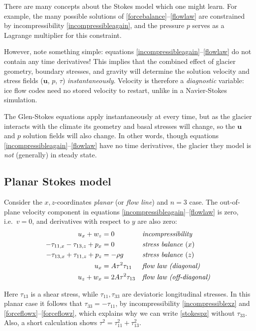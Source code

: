 \documentclass[letterpaper,final,12pt,reqno]{amsart}
\newcommand{\bu}{\mathbf{u}}
\begin{document}
There are many concepts about the Stokes model which one might learn.  For example, the many possible solutions of \eqref{forcebalance}--\eqref{flowlaw} are constrained by incompressibility \eqref{incompressibleagain}, and the pressure $p$ serves as a Lagrange multiplier for this constraint.

However, note something simple: equations \eqref{incompressibleagain}--\eqref{flowlaw} do not contain any time derivatives!  This implies that the combined effect of glacier geometry, boundary stresses, and gravity will determine \cite{JouvetRappaz2011} the solution velocity and stress fields ($\bu$, $p$, $\tau$) \emph{instantaneously}.  Velocity is therefore a \emph{diagnostic} variable: ice flow codes need no stored velocity to restart, unlike in a Navier-Stokes simulation.

The Glen-Stokes equations apply instantaneously at every time, but as the glacier interacts with the climate its geometry and basal stresses will change, so the $\bu$ and $p$ solution fields will also change.  In other words, though equations \eqref{incompressibleagain}--\eqref{flowlaw} have no time derivatives, the glacier they model is \emph{not} (generally) in steady state.

\subsection*{Planar Stokes model}  Consider the $x,z$-coordinates \emph{planar} (or \emph{flow line}) and $n=3$ case.  The out-of-plane velocity component in equations \eqref{incompressibleagain}--\eqref{flowlaw} is zero, i.e.~$v=0$, and derivatives with respect to $y$ are also zero:
\begin{align}
u_x + w_z &= 0 &&\text{\emph{incompressibility}} \label{incompressiblexz} \\
- \tau_{11,x} - \tau_{13,z} + p_x &= 0 &&\text{\emph{stress balance} ($x$)} \label{stokespx} \\
- \tau_{13,x} + \tau_{11,z} + p_z &= - \rho g &&\text{\emph{stress balance} ($z$)} \label{stokespz} \\
u_x &= A \tau^2 \tau_{11} &&\text{\emph{flow law (diagonal)}}  \label{forceflowx} \\
u_z + w _x &= 2 A \tau^2 \tau_{13} &&\text{\emph{flow law (off-diagonal)}} \label{forceflowz}
\end{align}

Here $\tau_{13}$ is a shear stress, while $\tau_{11},\tau_{33}$ are deviatoric longitudinal stresses.  In this planar case it follows that $\tau_{33}=-\tau_{11}$, by incompressibility \eqref{incompressiblexz} and \eqref{forceflowx}--\eqref{forceflowz}, which explains why we can write \eqref{stokespz} without $\tau_{33}$.  Also, a short calculation shows $\tau^2 = \tau_{11}^2+\tau_{13}^2$.
\end{document}
